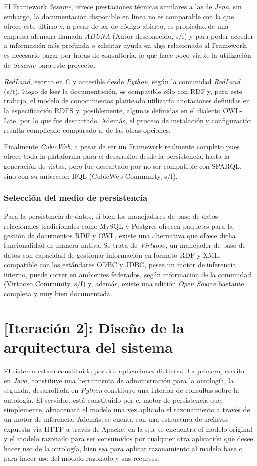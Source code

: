 El Framework \textit{Sesame}, ofrece prestaciones técnicas similares a las de \textit{Jena}, sin embargo, la documentación disponible en línea no es comparable con la que ofrece este último y, a pesar de ser de código abierto, es propiedad de una empresa alemana llamada \textit{ADUNA} (Autor desconocido, s/f) y para poder acceder a información más profunda o solicitar ayuda en algo relacionado al Framework, es necesario pagar por horas de consultoría, lo que hace poco viable la utilización de \textit{Sesame} para este proyecto.

\textit{RedLand}, escrito en C y accesible desde \textit{Python}, según la comunidad \textit{RedLand} (s/f), luego de leer la documentación, es compatible sólo con RDF y, para este trabajo, el modelo de conocimientos planteado utilizaría anotaciones definidas en la especificación RDFS y, posiblemente, algunas definidas en el dialecto OWL-Lite, por lo que fue descartado. Además, el proceso de instalación y configuración resulta complicado comparado al de las otras opciones.

Finalmente \textit{CubicWeb}, a pesar de ser un Framework realmente completo pues ofrece toda la plataforma para el desarrollo: desde la persistencia, hasta la generación de vistas, pero fue descartado por no ser compatible con SPARQL, sino con su antecesor: RQL (CubicWeb Community, s/f).

\subsubsection{Selección del medio de persistencia}
Para la persistencia de datos, si bien los manejadores de base de datos relacionales tradicionales como MySQL y Postgres ofrecen paquetes para la gestión de documentos RDF y OWL, existe una alternativa que ofrece dicha funcionalidad de manera nativa. Se trata de \textit{Virtuoso}, un manejador de base de datos con capacidad de gestionar información en formato RDF y XML, compatible con los estándares ODBC y JDBC, posee un motor de inferencia interno, puede correr en ambientes federados, según información de la comunidad (Virtuoso Community, s/f) y, además, existe una edición \textit{Open Source} bastante completa y muy bien documentada.

\section{[Iteración 2]: Diseño de la arquitectura del sistema}
El sistema estará constituido por dos aplicaciones distintas. La primera, escrita en \textit{Java}, constituye una herramienta de administración para la ontología, la segunda, desarrollada en \textit{Python} constituye una interfaz de consultas sobre la ontología. El servidor, está constituido por el motor de persistencia que, simplemente, almacenará el modelo una vez aplicado el razonamiento a través de un motor de inferencia. Además, se cuenta con una estructura de archivos expuesta vía HTTP a través de Apache, en la que se encuentra el modelo original y el modelo razonado para ser consumidos por cualquier otra aplicación que desee hacer uso de la ontología, bien sea para aplicar razonamiento al modelo base o para hacer uso del modelo razonado y sus recursos.

